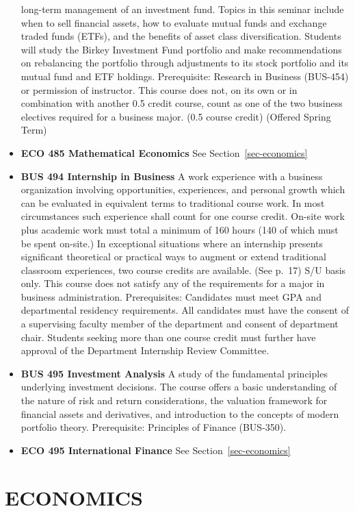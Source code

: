 \documentclass[
  letterpaper,
]{scrbook}
\begin{document}
\begin{itemize}
  long-term management of an investment fund. Topics in this seminar
  include when to sell financial assets, how to evaluate mutual funds
  and exchange traded funds (ETFs), and the benefits of asset class
  diversification. Students will study the Birkey Investment Fund
  portfolio and make recommendations on rebalancing the portfolio
  through adjustments to its stock portfolio and its mutual fund and ETF
  holdings. Prerequisite: Research in Business (BUS-454) or permission
  of instructor. This course does not, on its own or in combination with
  another 0.5 credit course, count as one of the two business electives
  required for a business major. (0.5 course credit) (Offered Spring
  Term)
\item
  \textbf{ECO 485 Mathematical Economics} See
  Section~\ref{sec-economics}
\item
  \textbf{BUS 494 Internship in Business} A work experience with a
  business organization involving opportunities, experiences, and
  personal growth which can be evaluated in equivalent terms to
  traditional course work. In most circumstances such experience shall
  count for one course credit. On-site work plus academic work must
  total a minimum of 160 hours (140 of which must be spent on-site.) In
  exceptional situations where an internship presents significant
  theoretical or practical ways to augment or extend traditional
  classroom experiences, two course credits are available. (See p.~17)
  S/U basis only. This course does not satisfy any of the requirements
  for a major in business administration. Prerequisites: Candidates must
  meet GPA and departmental residency requirements. All candidates must
  have the consent of a supervising faculty member of the department and
  consent of department chair. Students seeking more than one course
  credit must further have approval of the Department Internship Review
  Committee.
\item
  \textbf{BUS 495 Investment Analysis} A study of the fundamental
  principles underlying investment decisions. The course offers a basic
  understanding of the nature of risk and return considerations, the
  valuation framework for financial assets and derivatives, and
  introduction to the concepts of modern portfolio theory. Prerequisite:
  Principles of Finance (BUS-350).
\item
  \textbf{ECO 495 International Finance} See Section~\ref{sec-economics}
\end{itemize}

\section{ECONOMICS}\label{economics}
\end{document}
